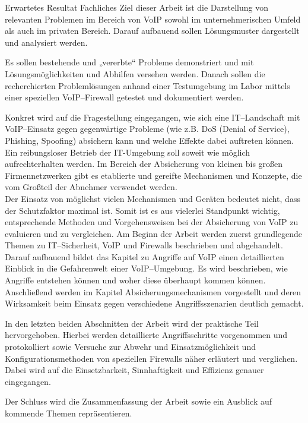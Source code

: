 \documentclass[a4paper,11pt,ngerman]{INSOexpose}
\begin{document}
\begin{section}{Erwartetes Resultat}
Fachliches Ziel dieser Arbeit ist die Darstellung von relevanten Problemen im Bereich von VoIP sowohl im unternehmerischen Umfeld als auch im privaten Bereich. Darauf aufbauend sollen Lösungsmuster dargestellt und analysiert werden. 

Es sollen bestehende und „vererbte“ Probleme demonstriert und mit Lösungsmöglichkeiten und Abhilfen versehen werden. 
Danach sollen die recherchierten Problemlösungen anhand einer Testumgebung im Labor mittels einer speziellen VoIP--Firewall getestet und dokumentiert werden.

Konkret wird auf die Fragestellung eingegangen, wie sich eine IT--Landschaft mit VoIP--Einsatz gegen gegenwärtige Probleme (wie z.B. DoS (Denial of Service), Phishing, Spoofing) absichern kann und welche Effekte dabei auftreten können. Ein reibungsloser Betrieb der IT-Umgebung soll soweit wie möglich aufrechterhalten werden.
Im Bereich der Absicherung von kleinen bis großen Firmennetzwerken gibt es etablierte und gereifte Mechanismen und Konzepte, die vom Großteil der Abnehmer verwendet werden. 
\cite[Qu]{Qu:2009:desactv} \\
Der Einsatz von möglichst vielen Mechanismen und Geräten bedeutet nicht, dass der Schutzfaktor maximal ist. Somit ist es aus vielerlei Standpunkt wichtig, entsprechende Methoden und Vorgehensweisen bei der Absicherung von VoIP zu evaluieren und zu vergleichen.
Am Beginn der Arbeit werden zuerst grundlegende Themen zu IT--Sicherheit, VoIP und Firewalls beschrieben und abgehandelt. Darauf aufbauend bildet das Kapitel zu Angriffe auf VoIP einen detaillierten Einblick in die Gefahrenwelt einer VoIP--Umgebung. Es wird beschrieben, wie Angriffe entstehen können und woher diese überhaupt kommen können. Anschließend werden im Kapitel Absicherungsmechanismen vorgestellt und deren Wirksamkeit beim Einsatz gegen verschiedene Angriffsszenarien deutlich gemacht.

In den letzten beiden Abschnitten der Arbeit wird der praktische Teil hervorgehoben. Hierbei werden detaillierte Angriffsschritte vorgenommen und protokolliert sowie Versuche zur Abwehr und Einsatzmöglichkeit und Konfigurationsmethoden von speziellen Firewalls näher erläutert und verglichen. Dabei wird auf die Einsetzbarkeit, Sinnhaftigkeit und Effizienz genauer eingegangen.

Der Schluss wird die Zusammenfassung der Arbeit sowie ein Ausblick auf kommende Themen repräsentieren.
\end{section}
\pagebreak
\end{document}
